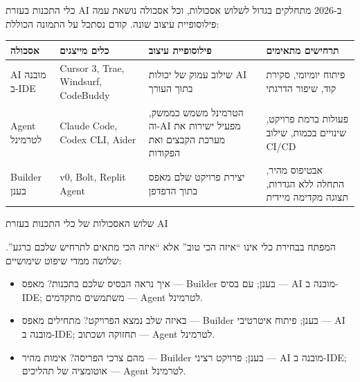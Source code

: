 


כלי התכנות בעזרת AI ב-2026 מתחלקים בגדול לשלוש אסכולות, וכל אסכולה נושאת עמה פילוסופיית עיצוב שונה. קודם נסתכל על התמונה הכוללת:

\begin{center}
\begin{tabularx}{\linewidth}{|X|X|X|X|}
\hline
\textbf{אסכולה} & \textbf{כלים מייצגים} & \textbf{פילוסופיית עיצוב} & \textbf{תרחישים מתאימים} \tabularnewline
\hline
AI מובנה ב-IDE & Cursor 3, Trae, Windsurf, CodeBuddy & שילוב עמוק של יכולות AI בתוך העורך & פיתוח יומיומי, סקירת קוד, שיפור הדרגתי \tabularnewline
Agent לטרמינל & Claude Code, Codex CLI, Aider & הטרמינל משמש כממשק, וה-AI מפעיל ישירות את מערכת הקבצים ואת הפקודות & פעולות ברמת פרויקט, שינויים בכמות, שילוב CI/CD \tabularnewline
Builder בענן & v0, Bolt, Replit Agent & יצירת פרויקט שלם מאפס בתוך הדפדפן & אבטיפוס מהיר, התחלה ללא הגדרות, תצוגה מקדימה מיידית \tabularnewline
\hline
\end{tabularx}
\end{center}

\begin{center}\small\color{gray}שלוש האסכולות של כלי התכנות בעזרת AI\end{center}

המפתח בבחירת כלי אינו “איזה הכי טוב” אלא “איזה הכי מתאים לתרחיש שלכם כרגע”. שלושה ממדי שיפוט שימושיים:

\begin{itemize}
  \item איך נראה הבסיס שלכם בתכנות? מאפס — Builder בענן; עם בסיס — AI מובנה ב-IDE; משתמשים מתקדמים — Agent לטרמינל.
  \item באיזה שלב נמצא הפרויקט? מתחילים מאפס — Builder בענן; פיתוח איטרטיבי — AI מובנה ב-IDE; תחזוקה ושכתוב — Agent לטרמינל.
  \item מהם צרכי הפריסה? אימות מהיר — Builder בענן; פרויקט רציני — AI מובנה ב-IDE; אוטומציה של תהליכים — Agent לטרמינל.
\end{itemize}


